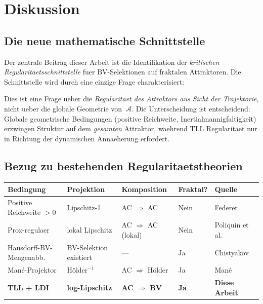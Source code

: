\documentclass[12pt,a4paper]{article}
\theoremstyle{definition}
\theoremstyle{plain}
\theoremstyle{remark}
\begin{document}
\section{Diskussion}
\label{sec:discussion}

\subsection{Die neue mathematische Schnittstelle}

Der zentrale Beitrag dieser Arbeit ist die Identifikation der
\emph{kritischen Regularitaetsschnittstelle} fuer BV-Selektionen
auf fraktalen Attraktoren.  Die Schnittstelle wird durch eine
einzige Frage charakterisiert:

\begin{center}
\end{center}

\noindent
Dies ist eine Frage ueber die \emph{Regularitaet des Attraktors
aus Sicht der Trajektorie}, nicht ueber die globale Geometrie
von~$\mathcal{A}$.  Die Unterscheidung ist entscheidend: Globale
geometrische Bedingungen (positive Reichweite, Inertialmannigfaltigkeit)
erzwingen Struktur auf dem \emph{gesamten} Attraktor, waehrend TLL
Regularitaet nur in Richtung der dynamischen Annaeherung erfordert.

\subsection{Bezug zu bestehenden Regularitaetstheorien}

\begin{center}
\begin{tabular}{lllll}
\hline
\textbf{Bedingung} & \textbf{Projektion} & \textbf{Komposition}
  & \textbf{Fraktal?} & \textbf{Quelle} \\
\hline
Positive Reichweite $> 0$
  & Lipschitz-1
  & AC $\Rightarrow$ AC
  & Nein
  & Federer~\cite{Federer1959} \\
Prox-regulaer
  & lokal Lipschitz
  & AC $\Rightarrow$ AC (lokal)
  & Nein
  & Poliquin et al.~\cite{PoliquinRockafellarThibault2000} \\
Hausdorff-BV-Mengenabb.
  & BV-Selektion existiert
  & ---
  & Ja
  & Chistyakov~\cite{Chistyakov2004} \\
Man\'e-Projektor
  & H\"older${}^{-1}$
  & AC $\Rightarrow$ H\"older
  & Ja
  & Man\'e~\cite{Mane1981} \\
\textbf{TLL + LDI}
  & \textbf{log-Lipschitz}
  & \textbf{AC $\Rightarrow$ BV}
  & \textbf{Ja}
  & \textbf{Diese Arbeit} \\
\hline
\end{tabular}
\end{center}
\end{document}
